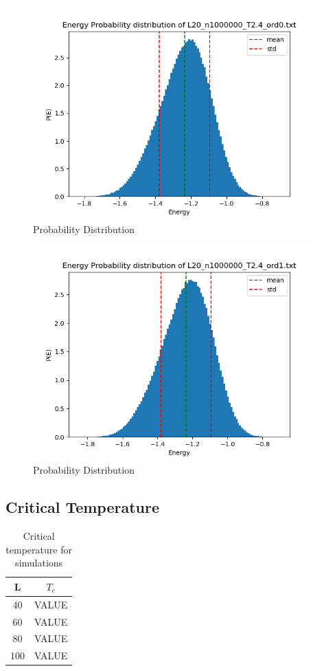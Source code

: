 \documentclass{article}
\begin{document}
\begin{figure}[ht]
    \centering
    \includegraphics[width = 11cm]{img/energyhistogram_L20_n1000000_T24_ord0.png}
    \caption{Probability Distribution}
    \label{fig:prob-highT-ord0}
  \end{figure}

\begin{figure}[ht]
    \centering
    \includegraphics[width = 11cm]{img/energyhistogram_L20_n1000000_T24_ord1.png}
    \caption{Probability Distribution}
    \label{fig:prob-highT-ord1}
  \end{figure}

\subsection{Critical Temperature}

  \begin{table}[ht]
    \centering
    \caption{Critical temperature for simulations}
    \vspace{2mm}
    \label{tab:criticaltemperature}
    \begin{tabular}{|c|c|}
        \hline
         L & $T_c$\\
        \hline \hline
        40 & VALUE \\
        60 & VALUE \\
        80 & VALUE \\
        100 & VALUE \\
        \hline
    \end{tabular} \\
    \hspace{0pt}\\
  \end{table}
\end{document}

